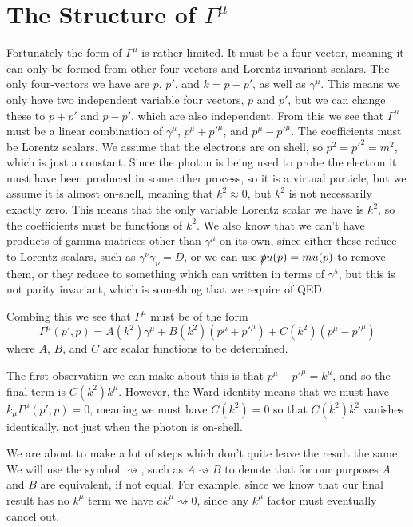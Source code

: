 \documentclass[fleqn]{NotesClass}
\begin{document}
    \section{The Structure of \texorpdfstring{\(\Gamma^\mu\)}{Gamma}}
    Fortunately the form of \(\Gamma^\mu\) is rather limited.
    It must be a four-vector, meaning it can only be formed from other four-vectors and Lorentz invariant scalars.
    The only four-vectors we have are \(p\), \(p'\), and \(k = p - p'\), as well as \(\gamma^\mu\).
    This means we only have two independent variable four vectors, \(p\) and \(p'\), but we can change these to \(p + p'\) and \(p - p'\), which are also independent.
    From this we see that \(\Gamma^\mu\) must be a linear combination of \(\gamma^\mu\), \(p^\mu + p'^\mu\), and \(p^\mu - p'^\mu\).
    The coefficients must be Lorentz scalars.
    We assume that the electrons are on shell, so \(p^2 = p'^2 = m^2\), which is just a constant.
    Since the photon is being used to probe the electron it must have been produced in some other process, so it is a virtual particle, but we assume it is almost on-shell, meaning that \(k^2 \approx 0\), but \(k^2\) is not necessarily exactly zero.
    This means that the only variable Lorentz scalar we have is \(k^2\), so the coefficients must be functions of \(k^2\).
    We also know that we can't have products of gamma matrices other than \(\gamma^\mu\) on its own, since either these reduce to Lorentz scalars, such as \(\gamma^\nu \gamma_\nu = D\), or we can use \(\slashed{p}u(p) = mu(p)\) to remove them, or they reduce to something which can written in terms of \(\gamma^5\), but this is not parity invariant, which is something that we require of QED.
    
    Combing this we see that \(\Gamma^\mu\) must be of the form
    \begin{equation}
        \Gamma^\mu(p', p) = A(k^2) \gamma^\mu + B(k^2)(p^\mu + p'^\mu) + C(k^2)(p^\mu - p'^\mu)
    \end{equation}
    where \(A\), \(B\), and \(C\) are scalar functions to be determined.
    
    The first observation we can make about this is that \(p^\mu - p'^\mu = k^\mu\), and so the final term is \(C(k^2) k^\mu\).
    However, the Ward identity means that we must have \(k_\mu \Gamma^\mu(p', p) = 0\), meaning we must have \(C(k^2) = 0\) so that \(C(k^2)k^2\) vanishes identically, not just when the photon is on-shell.
    
    \begin{ntn}{}{}
        We are about to make a lot of steps which don't quite leave the result the same.
        We will use the symbol \(\rightsquigarrow\), such as \(A \rightsquigarrow B\) to denote that for our purposes \(A\) and \(B\) are equivalent, if not equal.
        For example, since we know that our final result has no \(k^\mu\) term we have \(ak^\mu \rightsquigarrow 0\), since any \(k^\mu\) factor must eventually cancel out.
    \end{ntn}
    
\end{document}
